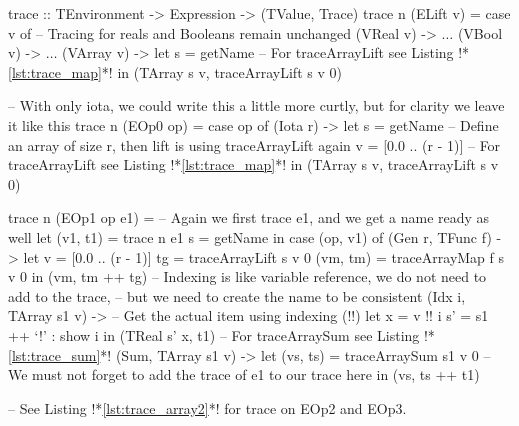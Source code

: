         \begin{haskell}[caption=Tracing away arrays, label=lst:trace_array, gobble=12]
            trace :: TEnvironment -> Expression -> (TValue, Trace)
            trace n (ELift v) =
                case v of
                    -- Tracing for reals and Booleans remain unchanged
                    (VReal  v) -> $\ldots$
                    (VBool  v) -> $\ldots$
                    (VArray v) -> let s = getName
                                  -- For traceArrayLift see Listing !*\ref{lst:trace_map}*!
                                  in  (TArray s v, traceArrayLift s v 0)
            
            -- With only iota, we could write this a little more curtly, but for clarity we leave it like this
            trace n (EOp0 op) =
                case op of
                    (Iota r) -> 
                        let s = getName
                            -- Define an array of size r, then lift is using traceArrayLift again
                            v = [0.0 .. (r - 1)]
                            -- For traceArrayLift see Listing !*\ref{lst:trace_map}*!
                        in  (TArray s v, traceArrayLift s v 0)
            
            trace n (EOp1 op e1) =
                -- Again we first trace e1, and we get a name ready as well
                let (v1, t1) = trace n e1
                    s = getName
                in  case (op, v1) of
                    (Gen r, TFunc f) ->
                        let v  = [0.0 .. (r - 1)]                            
                            tg = traceArrayLift s v 0
                            (vm, tm) = traceArrayMap f s v 0
                        in  (vm, tm ++ tg)
                    -- Indexing is like variable reference, we do not need to add to the trace,
                    -- but we need to create the name to be consistent
                    (Idx i, TArray s1 v) ->
                        -- Get the actual item using indexing (!!)
                        let x  = v !! i
                            s' = s1 ++ `!' : show i
                        in  (TReal s' x, t1)
                    -- For traceArraySum see Listing !*\ref{lst:trace_sum}*!
                    (Sum, TArray s1 v) ->
                        let (vs, ts) = traceArraySum s1 v 0
                        -- We must not forget to add the trace of e1 to our trace here
                        in  (vs, ts ++ t1)

            -- See Listing !*\ref{lst:trace_array2}*! for trace on EOp2 and EOp3.
        \end{haskell}

